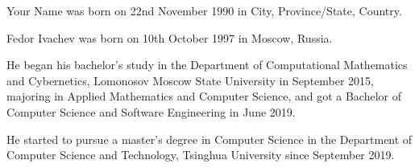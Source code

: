 
\begin{resume}

    Your Name was born on 22nd November 1990 in City, Province/State, Country. 
    
    Fedor Ivachev was born on 10th October 1997 in Moscow, Russia.
    
    He began his bachelor's study in the Department of Computational Mathematics and Cybernetics, Lomonosov Moscow State University in September 2015, majoring in Applied Mathematics and Computer Science, and got a Bachelor of Computer Science and Software Engineering in June 2019.
    
    He started to pursue a master's degree in Computer Science in the Department of Computer Science and Technology, Tsinghua University since September 2019.

\end{resume}

